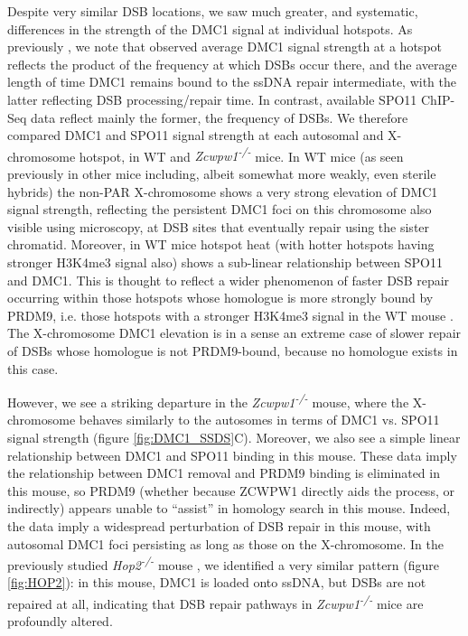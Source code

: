 Despite very similar DSB locations, we saw much greater, and systematic, differences in the strength of the DMC1 signal at individual hotspots. As previously \parencite{Davies2016Reengineering, Khil2012Sensitive}, we note that observed average DMC1 signal strength at a hotspot reflects the product of the frequency at which DSBs occur there, and the average length of time DMC1 remains bound to the ssDNA repair intermediate, with the latter reflecting DSB processing/repair time. In contrast, available SPO11 ChIP-Seq data \parencite{Lange2016Landscape} reflect mainly the former, the frequency of DSBs. We therefore compared DMC1 and SPO11 signal strength at each autosomal and X-chromosome hotspot, in WT and \textit{Zcwpw1\textsuperscript{-/-}} mice. In WT mice (as seen previously in other mice \parencite{Davies2016Reengineering} including, albeit somewhat more weakly, even sterile hybrids) the non-PAR X-chromosome shows a very strong elevation of DMC1 signal strength, reflecting the persistent DMC1 foci on this chromosome also visible using microscopy, at DSB sites that eventually repair using the sister chromatid. Moreover, in WT mice hotspot heat (with hotter hotspots having stronger H3K4me3 signal also) shows a sub-linear relationship between SPO11 and DMC1. This is thought to reflect a wider phenomenon of faster DSB repair occurring within those hotspots whose homologue is more strongly bound by PRDM9, i.e. those hotspots with a stronger H3K4me3 signal in the WT mouse \parencite{Davies2016Reengineering, Hinch2019Factors, Li2019highresolution}. The X-chromosome DMC1 elevation is in a sense an extreme case of slower repair of DSBs whose homologue is not PRDM9-bound, because no homologue exists in this case.

However, we see a striking departure in the \textit{Zcwpw1\textsuperscript{-/-}} mouse, where the X-chromosome behaves similarly to the autosomes in terms of DMC1 vs. SPO11 signal strength (figure \ref{fig:DMC1_SSDS}C). Moreover, we also see a simple linear relationship between DMC1 and SPO11 binding in this mouse. These data imply the relationship between DMC1 removal and PRDM9 binding is eliminated in this mouse, so PRDM9 (whether because ZCWPW1 directly aids the process, or indirectly) appears unable to ``assist'' in homology search in this mouse. Indeed, the data imply a widespread perturbation of DSB repair in this mouse, with autosomal DMC1 foci persisting as long as those on the X-chromosome. In the previously studied \textit{Hop2\textsuperscript{-/-}} mouse \parencite{Khil2012Sensitive, Petukhova2003Hop2, Smagulova2011Genomewide}, we identified a very similar pattern (figure \ref{fig:HOP2}): in this mouse, DMC1 is loaded onto ssDNA, but DSBs are not repaired at all, indicating that DSB repair pathways in \textit{Zcwpw1\textsuperscript{-/-}} mice are profoundly altered.

